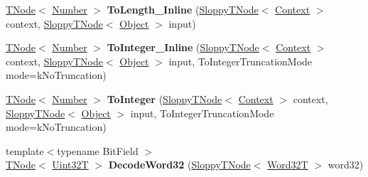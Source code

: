 \begin{DoxyCompactItemize}
\item 
\mbox{\label{classv8_1_1internal_1_1CodeStubAssembler_a16fa63e43b2dfa2c6ffbec2cdce0e6d3}} 
\mbox{\hyperlink{classv8_1_1internal_1_1compiler_1_1TNode}{T\+Node}}$<$ \mbox{\hyperlink{structv8_1_1internal_1_1UnionT}{Number}} $>$ {\bfseries To\+Length\+\_\+\+Inline} (\mbox{\hyperlink{classv8_1_1internal_1_1compiler_1_1SloppyTNode}{Sloppy\+T\+Node}}$<$ \mbox{\hyperlink{classv8_1_1internal_1_1Context}{Context}} $>$ context, \mbox{\hyperlink{classv8_1_1internal_1_1compiler_1_1SloppyTNode}{Sloppy\+T\+Node}}$<$ \mbox{\hyperlink{classv8_1_1internal_1_1Object}{Object}} $>$ input)
\item 
\mbox{\label{classv8_1_1internal_1_1CodeStubAssembler_ac0a7711cfe91ba81074103754cb510ce}} 
\mbox{\hyperlink{classv8_1_1internal_1_1compiler_1_1TNode}{T\+Node}}$<$ \mbox{\hyperlink{structv8_1_1internal_1_1UnionT}{Number}} $>$ {\bfseries To\+Integer\+\_\+\+Inline} (\mbox{\hyperlink{classv8_1_1internal_1_1compiler_1_1SloppyTNode}{Sloppy\+T\+Node}}$<$ \mbox{\hyperlink{classv8_1_1internal_1_1Context}{Context}} $>$ context, \mbox{\hyperlink{classv8_1_1internal_1_1compiler_1_1SloppyTNode}{Sloppy\+T\+Node}}$<$ \mbox{\hyperlink{classv8_1_1internal_1_1Object}{Object}} $>$ input, To\+Integer\+Truncation\+Mode mode=k\+No\+Truncation)
\item 
\mbox{\label{classv8_1_1internal_1_1CodeStubAssembler_a8d1f862f3957b60d75dd9b5e35a0d239}} 
\mbox{\hyperlink{classv8_1_1internal_1_1compiler_1_1TNode}{T\+Node}}$<$ \mbox{\hyperlink{structv8_1_1internal_1_1UnionT}{Number}} $>$ {\bfseries To\+Integer} (\mbox{\hyperlink{classv8_1_1internal_1_1compiler_1_1SloppyTNode}{Sloppy\+T\+Node}}$<$ \mbox{\hyperlink{classv8_1_1internal_1_1Context}{Context}} $>$ context, \mbox{\hyperlink{classv8_1_1internal_1_1compiler_1_1SloppyTNode}{Sloppy\+T\+Node}}$<$ \mbox{\hyperlink{classv8_1_1internal_1_1Object}{Object}} $>$ input, To\+Integer\+Truncation\+Mode mode=k\+No\+Truncation)
\item 
\mbox{\label{classv8_1_1internal_1_1CodeStubAssembler_aa02cac4a1b19e37952bd50df1da75923}} 
{\footnotesize template$<$typename Bit\+Field $>$ }\\\mbox{\hyperlink{classv8_1_1internal_1_1compiler_1_1TNode}{T\+Node}}$<$ \mbox{\hyperlink{structv8_1_1internal_1_1Uint32T}{Uint32T}} $>$ {\bfseries Decode\+Word32} (\mbox{\hyperlink{classv8_1_1internal_1_1compiler_1_1SloppyTNode}{Sloppy\+T\+Node}}$<$ \mbox{\hyperlink{structv8_1_1internal_1_1Word32T}{Word32T}} $>$ word32)

\end{DoxyCompactItemize}
